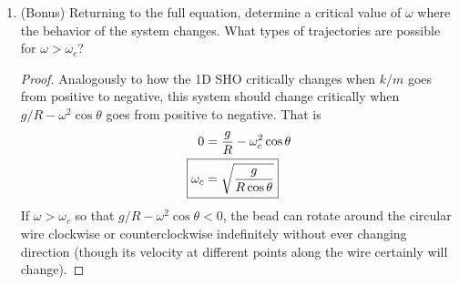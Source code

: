 \documentclass[../psets.tex]{subfiles}
\begin{document}
\begin{enumerate}
\begin{enumerate}
        \begin{proof}
            When $\theta$ is small, $\cos\theta\approx 1$ and $\sin\theta\approx\theta$. Plugging these approximations into the EOM from part (b) yields
            \begin{equation*}
                \boxed{\ddot{\theta} = -\left( \frac{g}{R}-\omega^2 \right)\theta}
            \end{equation*}
            We may observe that this EOM has an analogous structure to the 1D SHO EOM, obtained by pairing $k/m$ there with $g/R-\omega^2$ here. Thus, assuming that $g/R-\omega^2>0$, the system will oscillate with angular frequency
            \begin{equation*}
                \tilde{\omega} = \sqrt{\frac{g}{R}-\omega^2}
            \end{equation*}
            Therefore, since the angular frequency equals $2\pi$ times the frequency, the frequency of the oscillations will be
            \begin{equation*}
                \boxed{f = \frac{1}{2\pi}\sqrt{\frac{g}{R}-\omega^2}}
            \end{equation*}
        \end{proof}
        \item (Bonus) Returning to the full equation, determine a critical value of $\omega$ where the behavior of the system changes. What types of trajectories are possible for $\omega>\omega_c$?
        \begin{proof}
            Analogously to how the 1D SHO critically changes when $k/m$ goes from positive to negative, this system should change critically when $g/R-\omega^2\cos\theta$ goes from positive to negative. That is
            \begin{align*}
                0 &= \frac{g}{R}-\omega_c^2\cos\theta\\
                \Aboxed{\omega_c &= \sqrt{\frac{g}{R\cos\theta}}}
            \end{align*}
            If $\omega>\omega_c$ so that $g/R-\omega^2\cos\theta<0$, the bead can rotate around the circular wire clockwise or counterclockwise indefinitely without ever changing direction (though its velocity at different points along the wire certainly will change).
        \end{proof}
    \end{enumerate}
\end{enumerate}
\end{document}
